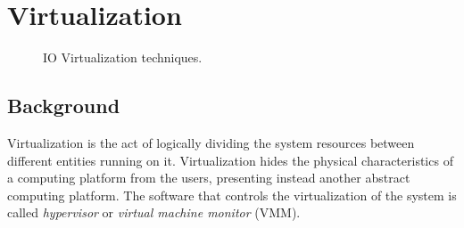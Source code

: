 \chapter{Virtualization}
\label{chap:virt}


\begin{figure}[!ht]
  \centering
    \hfill
    \hfill
    \caption{IO Virtualization techniques.
      \label{fig:storage}}
    
\end{figure}



\section{Background}
Virtualization is the act of logically dividing the system resources between different entities
running on it. Virtualization hides the physical characteristics of a computing platform from the users,
presenting instead another abstract computing platform. The software that controls the virtualization of the
system is called \emph{hypervisor} or \emph{virtual machine monitor} (VMM).

